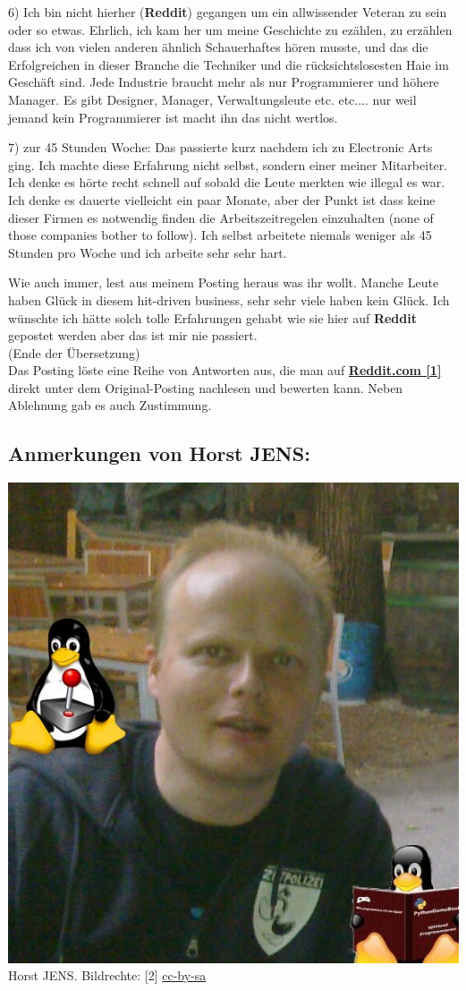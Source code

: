 6) Ich bin nicht hierher (\textbf{Reddit}) gegangen um ein allwissender Veteran zu sein oder so etwas. Ehrlich, ich kam her um meine Geschichte zu ezählen, zu erzählen dass ich von vielen anderen ähnlich Schauerhaftes hören musste, und das die Erfolgreichen in dieser Branche die Techniker und die rücksichtslosesten Haie im Geschäft sind. Jede Industrie braucht mehr als nur Programmierer und höhere Manager. Es gibt Designer, Manager, Verwaltungsleute etc. etc.... nur weil jemand kein Programmierer ist macht ihn das nicht wertlos.
 
7) zur 45 Stunden Woche: Das passierte kurz nachdem ich zu Electronic Arts ging. Ich machte diese Erfahrung nicht selbst, sondern einer meiner Mitarbeiter. Ich denke es hörte recht schnell auf sobald die Leute merkten wie illegal es war. Ich denke es dauerte vielleicht ein paar Monate, aber der Punkt ist dass keine dieser Firmen es notwendig finden die Arbeitszeitregelen einzuhalten (none of those companies bother to follow). Ich selbst arbeitete niemals weniger als 45 Stunden pro Woche und ich arbeite sehr sehr hart. 

Wie auch immer, lest aus meinem Posting heraus was ihr wollt. Manche Leute haben Glück in diesem hit-driven business, sehr sehr viele haben kein Glück. Ich wünschte ich hätte solch tolle Erfahrungen gehabt wie sie hier auf \textbf{Reddit} gepostet werden aber das ist mir nie passiert. \\

(Ende der Übersetzung) \\

Das Posting löste eine Reihe von Antworten aus, die man auf \href{http://www.reddit.com/r/gamedev/comments/z83h2/the_games_industry_is_a_scam_and_this_is_why_you}{\textbf{Reddit.com [1]}} direkt unter dem Original-Posting nachlesen und bewerten kann. Neben Ablehnung gab es auch Zustimmung.

\subsection*{Anmerkungen von Horst JENS:}
\begin{center}
\includegraphics[width=0.6\linewidth]{redditrant/horst2011mitdoppeltux.jpg} \\
\footnotesize{Horst JENS. Bildrechte: [2] \href{http://creativecommons.org/licenses/by-sa/4.0/deed.de}{cc-by-sa}}
\end{center}

